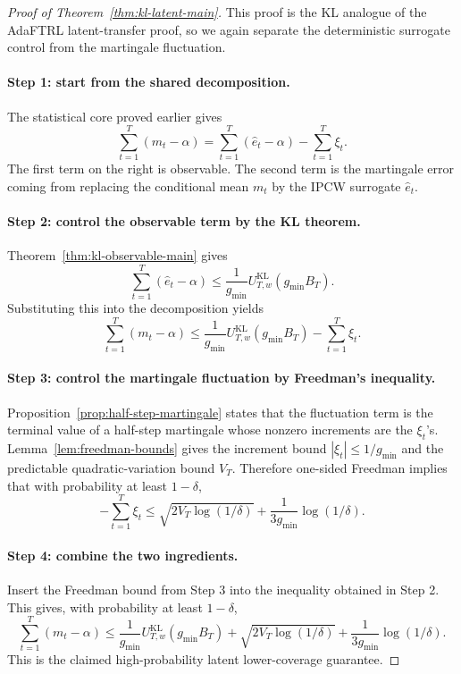\documentclass[11pt]{article}
\newcommand{\1}{\mathbf{1}}
\begin{document}
\begin{proof}[Proof of Theorem~\ref{thm:kl-latent-main}]
This proof is the KL analogue of the AdaFTRL latent-transfer proof, so we again separate the deterministic surrogate control from the martingale fluctuation.

\paragraph{Step 1: start from the shared decomposition.}
The statistical core proved earlier gives
\[
\sum_{t=1}^T (m_t-\alpha)
=
\sum_{t=1}^T(\hat e_t-\alpha)-\sum_{t=1}^T\xi_t.
\]
The first term on the right is observable. The second term is the martingale error coming from replacing the conditional mean $m_t$ by the IPCW surrogate $\hat e_t$.

\paragraph{Step 2: control the observable term by the KL theorem.}
Theorem~\ref{thm:kl-observable-main} gives
\[
\sum_{t=1}^T(\hat e_t-\alpha)
\le
\frac{1}{g_{\min}}U_{T,w}^{\mathrm{KL}}(g_{\min}B_T).
\]
Substituting this into the decomposition yields
\[
\sum_{t=1}^T (m_t-\alpha)
\le
\frac{1}{g_{\min}}U_{T,w}^{\mathrm{KL}}(g_{\min}B_T)-\sum_{t=1}^T\xi_t.
\]

\paragraph{Step 3: control the martingale fluctuation by Freedman's inequality.}
Proposition~\ref{prop:half-step-martingale} states that the fluctuation term is the terminal value of a half-step martingale whose nonzero increments are the $\xi_t$'s. Lemma~\ref{lem:freedman-bounds} gives the increment bound $|\xi_t|\le 1/g_{\min}$ and the predictable quadratic-variation bound $V_T$. Therefore one-sided Freedman implies that with probability at least $1-\delta$,
\[
-\sum_{t=1}^T\xi_t
\le
\sqrt{2V_T\log(1/\delta)}
+
\frac{1}{3g_{\min}}\log(1/\delta).
\]

\paragraph{Step 4: combine the two ingredients.}
Insert the Freedman bound from Step 3 into the inequality obtained in Step 2. This gives, with probability at least $1-\delta$,
\[
\sum_{t=1}^T (m_t-\alpha)
\le
\frac{1}{g_{\min}}U_{T,w}^{\mathrm{KL}}(g_{\min}B_T)
+
\sqrt{2V_T\log(1/\delta)}
+
\frac{1}{3g_{\min}}\log(1/\delta).
\]
This is the claimed high-probability latent lower-coverage guarantee.
\end{proof}
\end{document}
